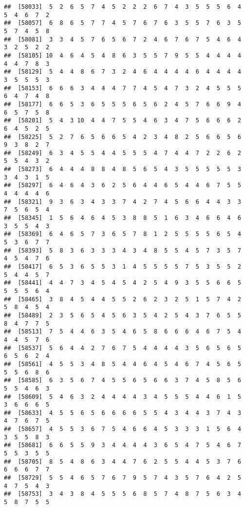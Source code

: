 \documentclass[
]{book}
\begin{document}
\begin{verbatim}
##  [58033]  5  2  6  5  7  4  5  2  2  2  6  7  4  3  5  5  5  6  4  5  4  6  7  2
##  [58057]  6  8  6  5  7  7  4  5  7  6  7  6  3  5  5  7  6  3  5  5  7  4  5  8
##  [58081]  3  3  4  5  7  6  5  6  7  2  4  6  7  6  7  5  4  6  4  3  2  5  2  2
##  [58105] 10  4  6  4  5  4  8  6  3  5  5  7  9  5  5  4  4  4  4  4  4  7  8  3
##  [58129]  5  4  4  8  6  7  3  2  4  6  4  4  4  4  6  4  4  4  4  3  5  5  5  3
##  [58153]  6  6  6  3  4  4  4  7  7  4  5  4  7  3  2  4  5  5  5  6  4  7  4  8
##  [58177]  6  6  5  3  6  5  5  5  6  5  6  2  4  5  7  6  6  9  4  6  5  7  5  8
##  [58201]  5  4  3 10  4  4  7  5  5  4  6  3  4  7  5  6  6  6  2  6  4  5  2  5
##  [58225]  5  2  7  6  5  6  6  5  4  2  3  4  8  2  5  6  6  5  6  9  3  8  2  7
##  [58249]  6  3  4  5  5  4  4  5  5  5  4  7  4  4  7  2  2  6  2  5  5  4  3  2
##  [58273]  6  4  4  4  8  8  4  8  5  6  5  4  3  5  5  5  5  5  3  3  4  3  1  5
##  [58297]  6  4  6  4  3  6  2  5  6  4  4  6  5  4  4  6  7  5  5  4  4  4  4  6
##  [58321]  9  3  6  3  4  3  3  7  4  2  7  4  5  6  6  4  4  3  3  7  5  6  5  4
##  [58345]  1  5  6  4  6  4  5  3  8  8  5  1  6  3  4  6  6  4  6  3  5  5  4  3
##  [58369]  6  4  6  5  7  3  6  5  7  8  1  2  5  5  5  5  6  5  4  5  3  6  7  7
##  [58393]  5  8  3  6  3  3  3  4  3  4  8  5  5  4  5  7  3  5  7  4  5  4  7  6
##  [58417]  6  5  3  6  5  5  3  1  4  5  5  5  5  7  5  3  5  5  2  5  4  4  5  7
##  [58441]  4  4  7  3  4  5  4  5  4  2  5  4  9  3  5  5  6  6  5  5  5  5  6  4
##  [58465]  3  8  4  5  4  4  5  5  2  6  2  3  2  5  1  5  7  4  2  5  8  4  5  4
##  [58489]  2  3  5  6  5  4  5  6  3  5  4  2  5  4  3  7  6  5  5  8  4  7  7  5
##  [58513]  7  5  4  4  6  3  5  4  6  5  8  6  6  6  4  6  7  5  4  4  4  5  7  6
##  [58537]  5  6  4  4  2  7  6  7  5  4  4  4  4  3  5  6  5  6  5  6  5  6  2  4
##  [58561]  4  5  5  3  4  8  5  4  4  6  4  5  4  6  7  4  5  6  5  5  5  6  8  6
##  [58585]  6  3  5  6  7  4  5  5  6  5  6  6  3  7  4  5  8  5  6  5  5  4  6  3
##  [58609]  5  4  6  3  2  4  4  4  4  3  4  5  5  5  4  4  6  1  5  3  6  6  6  5
##  [58633]  4  5  5  6  5  6  6  6  6  5  5  4  3  4  4  3  7  4  3  4  7  6  7  5
##  [58657]  4  5  5  3  6  7  5  4  6  6  4  5  3  3  3  1  5  6  4  3  5  5  8  3
##  [58681]  6  6  5  5  9  3  4  4  4  4  3  6  5  4  7  5  4  6  7  5  5  3  5  5
##  [58705]  8  5  4  8  6  3  4  4  7  6  2  5  5  4  4  5  3  7  6  6  6  6  7  7
##  [58729]  5  5  4  6  5  7  6  7  9  5  7  4  3  5  7  6  4  2  5  4  7  5  4  3
##  [58753]  3  4  3  8  4  5  5  5  6  8  5  7  4  8  7  5  6  3  4  5  8  7  5  5

\end{verbatim}
\end{document}
